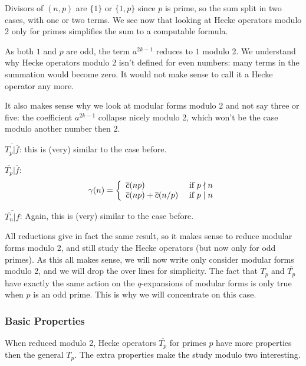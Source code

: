 Divisors of $(n,p)$ are $\{1\}$ or $\{1,p\}$ since $p$ is prime, so the sum split in two cases, with one or two terms.
We see now that looking at Hecke operators modulo 2 only for primes simplifies the sum to a computable formula.

As both $1$ and $p$ are odd, the term $a^{2k-1}$ reduces to $1$ modulo 2.
We understand why Hecke operators modulo 2 isn't defined for even numbers: many terms in the summation would become zero.
It would not make sense to call it a Hecke operator any more.

It also makes sense why we look at modular forms modulo 2 and not say three or five: the coefficient $a^{2k-1}$ collapse nicely modulo 2, which won't be the case modulo another number then 2.

$\overline{T_p|\overline{f}}$:
this is (very) similar to the case before.

$\overline{T_p}|\overline{f}$:
$$
\gamma(n)
= \left\lbrace
\begin{array}{l l}
  \overline{c}(np)                   & \text{ if } p \nmid n \\
  \overline{c}(np)+\overline{c}(n/p) & \text{ if } p \mid  n
\end{array}
\right.
$$

$\overline{\overline{T_n}|f}$:
Again, this is (very) similar to the case before.

All reductions give in fact the same result, so it makes sense to reduce modular forms modulo 2, and still study the Hecke operators (but now only for odd primes).
As this all makes sense, we will now write only consider modular forms modulo 2, and we will drop the over lines for simplicity.
The fact that $T_p$ and $\overline{T_p}$ have exactly the same action on the $q$-expansions of modular forms is only true when $p$ is an odd prime.
This is why we will concentrate on this case.

\subsubsection{Basic Properties}
When reduced modulo 2, Hecke operators $\overline{T_p}$ for primes $p$ have more properties then the general $T_p$.
The extra properties make the study modulo two interesting.

